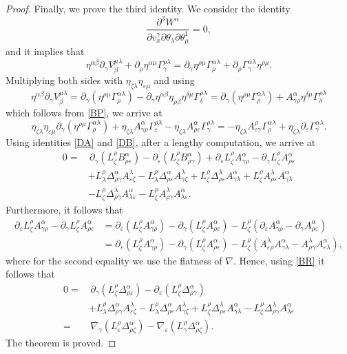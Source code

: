 \documentclass[10pt,a4paper]{amsart}
\newcommand{\Qd}{\Delta}
\newcommand{\Qg}{\Gamma}
\newcommand{\kk}[1]{\left(#1\right)}
\newcommand{\qa}{\alpha}
\newcommand{\qb}{\beta}
\newcommand{\qd}{\delta}
\newcommand{\qe}{\varepsilon}
\newcommand{\qg}{\gamma}
\newcommand{\ql}{\lambda}
\newcommand{\qp}{\partial}
\newcommand{\qth}{\theta}
\newcommand{\qz}{\zeta}
\begin{document}
\begin{proof}
Finally, we prove the third identity. We consider the identity 
\[
\frac{\qp^3 W^\qa}{\qp v^\qg_x\qp\qth_\ql\qp\qth_\mu^1} = 0,
\]
and it implies that 
\[
\eta^{\qa\qb}\qp_\qg V^{\mu\ql}_\qb+\qp_\rho\eta^{\qa\mu}\Qg^{\rho\ql}_\qg = \qp_\qg\eta^{\rho\mu}\Qg^{\qa\ql}_\rho+\qp_\rho\Qg^{\qa\ql}_\qg \eta^{\rho\mu}.
\]
Multiplying both sides with $\eta_{\qz\ql}\eta_{\qe\mu}$ and using 
\[
\eta^{\qa\qb}\qp_\qg V^{\mu\ql}_\qb = \qp_\qg\kk{\eta^{\rho\mu}\Qg^{\qa\ql}_\rho}-\qp_\qg\eta^{\qa\qb}\eta_{\rho\qb}\eta^{\qd\mu}\Qg^{\rho\ql}_\qd = \qp_\qg\kk{\eta^{\rho\mu}\Qg^{\qa\ql}_\rho}+A^\qa_{\qg\rho}\eta^{\qd\mu}\Qg^{\rho\ql}_\qd
\]
which follows from \eqref{BP}, we arrive at 
\begin{equation*}
\eta_{\qz\ql}\eta_{\qe\mu}\qp_\qg\kk{\eta^{\rho\mu}\Qg^{\qa\ql}_\rho}+\eta_{\qz\ql}A^\qa_{\qg\rho}\Qg^{\rho\ql}_\qe-\eta_{\qz\ql}A^\qa_{\rho\qe}\Qg^{\rho\ql}_\qg = -\eta_{\qz\ql}A^\rho_{\qe\qg}\Qg^{\qa\ql}_\rho+\eta_{\qz\ql}\qp_\qe\Qg^{\qa\ql}_\qg.
\end{equation*}
Using identities \eqref{DA} and \eqref{DB}, after a lengthy computation, we arrive at 
\begin{align*}
  0=&\, \qp_\qg\kk{L^\rho_\qz B^\qa_{\rho\qe}}-\qp_\qe\kk{L^\rho_\qz B^\qa_{\rho\qg}}+\qp_\qe L^\rho_\qz A^\qa_{\qg\rho}-\qp_\qg L^\rho_\qz A^\qa_{\rho\qe}\\
  &+L^\rho_\ql\Qd^\qa_{\rho\qg}A^\ql_{\qe\qz}-L^\rho_\ql \Qd^\qa_{\rho\qe}A^\ql_{\qg\qz}+L^\rho_\qz\Qd^\ql_{\rho\qe}A^\qa_{\qg\ql}+L^\rho_\qz A^\ql_{\rho\qe}A^\qa_{\qg\ql}\\
  &-L^\rho_\qz\Qd^\ql_{\rho\qg}A^\qa_{\ql\qe}-L^\rho_\qz A^\ql_{\rho\qg}A^\qa_{\ql\qe}.
\end{align*}
Furthermore, it follows that
\begin{align*}
  \qp_\qe L^\rho_\qz A^\qa_{\qg\rho}-\qp_\qg L^\rho_\qz A^\qa_{\rho\qe} &=\qp_\qe\kk{ L^\rho_\qz A^\qa_{\qg\rho}}-\qp_\qg \kk{L^\rho_\qz A^\qa_{\rho\qe}}- L^\rho_\qz\kk{\qp_\qe A^\qa_{\qg\rho}-\qp_\qg A^\qa_{\rho\qe}}\\
  &=\qp_\qe\kk{ L^\rho_\qz A^\qa_{\qg\rho}}-\qp_\qg \kk{L^\rho_\qz A^\qa_{\rho\qe}}- L^\rho_\qz\kk{A^\ql_{\qe\rho}A^\qa_{\qg\ql}-A^\ql_{\rho\qg}A^\qa_{\qe\ql}},
\end{align*}
where for the second equality we use the flatness of $\nabla$. Hence, using \eqref{BR} it follows that
\begin{align*}
  0=&\, \qp_\qg\kk{L^\rho_\qz \Qd^\qa_{\rho\qe}}-\qp_\qe\kk{L^\rho_\qz \Qd^\qa_{\rho\qg}}\\
  &+L^\rho_\ql\Qd^\qa_{\rho\qg}A^\ql_{\qe\qz}-L^\rho_\ql \Qd^\qa_{\rho\qe}A^\ql_{\qg\qz}+L^\rho_\qz\Qd^\ql_{\rho\qe}A^\qa_{\qg\ql}-L^\rho_\qz\Qd^\ql_{\rho\qg}A^\qa_{\ql\qe}\\
  =&\,\nabla_\qg\kk{L^\rho_\qe \Qd^\qa_{\rho\qz}}-\nabla_\qe\kk{L^\rho_\qg \Qd^\qa_{\rho\qz}}.
\end{align*} 
The theorem is proved.
\end{proof}
\end{document}
